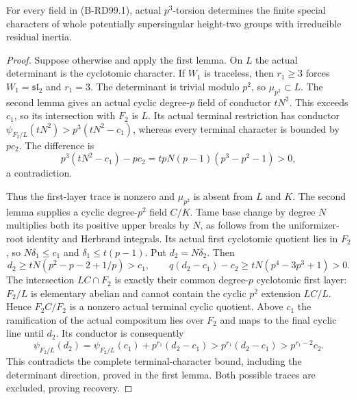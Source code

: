 \begin{theorem}
\label{thm:B-RD99-irreducible}
For every field in (B-RD99.1), actual $p^3$-torsion determines
the finite special characters of whole potentially supersingular
height-two groups with irreducible residual inertia.
\end{theorem}
\begin{proof}
Suppose otherwise and apply the first lemma. On $L$ the actual
determinant is the cyclotomic character. If $W_1$ is traceless,
then $r_1\ge3$ forces $W_1=\mathfrak{sl}_2$ and $r_1=3$.
The determinant is trivial modulo $p^2$, so $\mu_{p^2}\subset L$.
The second lemma gives an actual cyclic degree-$p$ field of
conductor $tN^2$. This exceeds $c_1$, so its intersection with
$F_2$ is $L$. Its actual terminal restriction has conductor
$\psi_{F_2/L}(tN^2)>p^3(tN^2-c_1)$, whereas every terminal
character is bounded by $pc_2$. The difference is
\[
 p^3(tN^2-c_1)-pc_2
                 =tpN(p-1)(p^3-p^2-1)>0,             \tag{B-RD99.15}
\]
a contradiction.

Thus the first-layer trace is nonzero and $\mu_{p^2}$ is
absent from $L$ and $K$. The second lemma supplies a cyclic
degree-$p^2$ field $C/K$. Tame base change by degree $N$
multiplies both its positive upper breaks by $N$, as follows
from the uniformizer-root identity and Herbrand integrals.
Its actual first cyclotomic quotient lies in $F_2$, so
$N\delta_1\le c_1$ and $\delta_1\le t(p-1)$.
Put $d_2=N\delta_2$. Then
\[
 d_2\ge tN(p^2-p-2+1/p)>c_1,\qquad
 q(d_2-c_1)-c_2\ge tN(p^4-3p^3+1)>0.                \tag{B-RD99.16}
\]
The intersection $LC\cap F_2$ is exactly their common
degree-$p$ cyclotomic first layer: $F_2/L$ is elementary
abelian and cannot contain the cyclic $p^2$ extension $LC/L$.
Hence $F_2C/F_2$ is a nonzero actual terminal cyclic quotient.
Above $c_1$ the ramification of the actual compositum lies
over $F_2$ and maps to the final cyclic line until $d_2$.
Its conductor is consequently
\[
 \psi_{F_2/L}(d_2)
   =\psi_{F_2/L}(c_1)+p^{r_1}(d_2-c_1)
   >p^{r_1}(d_2-c_1)>p^{r_1-2}c_2.                 \tag{B-RD99.17}
\]
This contradicts the complete terminal-character bound,
including the determinant direction, proved in the first lemma.
Both possible traces are excluded, proving recovery.
\end{proof}

